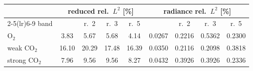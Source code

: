 \begin{tabular}{lcccccccc}
\toprule
 & \multicolumn{4}{c}{reduced rel.\ $L^2$ [\%]} & \multicolumn{4}{c}{radiance rel.\ $L^2$ [\%]} \\
\cmidrule(lr){2-5}\cmidrule(lr){6-9}
band & \cite{nmkc} & r.\ 2 & r.\ 3 & r.\ 5 & \cite{nmkc} & r.\ 2 & r.\ 3 & r.\ 5 \\
\midrule
O$_2$ & 3.83 & 5.67 & 5.68 & 4.14 & 0.0267 & 0.2216 & 0.5362 & 0.2300 \\
weak CO$_2$ & 16.10 & 20.29 & 17.48 & 16.39 & 0.0350 & 0.2116 & 0.2098 & 0.3818 \\
strong CO$_2$ & 7.96 & 9.56 & 9.56 & 8.27 & 0.0432 & 0.3926 & 0.3926 & 0.2336 \\
\bottomrule
\end{tabular}
